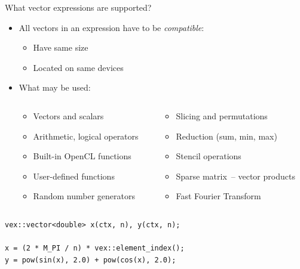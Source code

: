 \documentclass[@BEAMER_OPTIONS@]{beamer}
\begin{document}
\begin{frame}[fragile]{What vector expressions are supported?}
    \begin{itemize}
        \item All vectors in an expression have to be \emph{compatible}:
            \begin{itemize}
                \item Have same size
                \item Located on same devices
            \end{itemize}
        \item What may be used:
            \begin{columns}
                \begin{column}{0.42\textwidth}
                    \begin{itemize}
                        \item Vectors and scalars
                        \item Arithmetic, logical operators
                        \item Built-in OpenCL functions
                        \item User-defined functions
                        \item Random number generators
                    \end{itemize}
                \end{column}
                \begin{column}{0.4\textwidth}
                    \begin{itemize}
                        \item Slicing and permutations
                        \item Reduction (sum, min, max)
                        \item Stencil operations
                        \item Sparse matrix~-- vector products
                        \item Fast Fourier Transform
                    \end{itemize}
                \end{column}
            \end{columns}
    \end{itemize}
    \begin{exampleblock}{}
        \begin{lstlisting}
vex::vector<double> x(ctx, n), y(ctx, n);

x = (2 * M_PI / n) * vex::element_index();
y = pow(sin(x), 2.0) + pow(cos(x), 2.0);
        \end{lstlisting}
    \end{exampleblock}
\end{frame}
\end{document}
